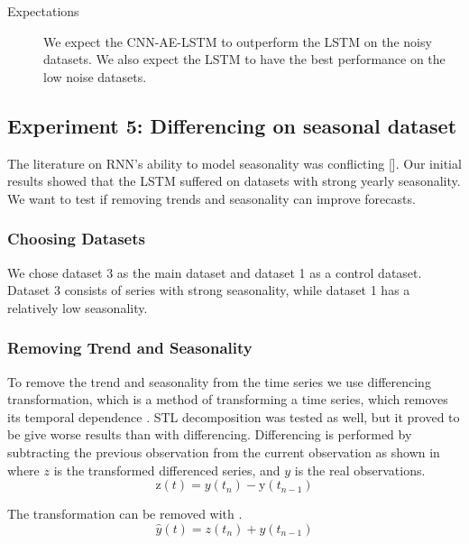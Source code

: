 \begin{description}
  \item[Expectations]{
              We expect the CNN-AE-LSTM to outperform the LSTM on the noisy datasets.
              We also expect the LSTM to have the best performance on the low noise datasets.
        }
\end{description}

\subsection{Experiment 5: Differencing on seasonal dataset}
\label{section:results:additional-experimental-plan:Experiment-5}
The literature on RNN's ability to model seasonality was conflicting [].
Our initial results showed that the LSTM suffered on datasets with strong yearly seasonality.
We want to test if removing trends and seasonality can improve forecasts.

\subsubsection{Choosing Datasets}
We chose dataset 3 as the main dataset and dataset 1 as a control dataset.
Dataset 3 consists of series with strong seasonality, while dataset 1 has a relatively low seasonality.

\subsubsection{Removing Trend and Seasonality}
To remove the trend and seasonality from the time series
we use differencing transformation, which is a method of transforming a time series,
which removes its temporal dependence \cite[p. 215]{RobJHyndman2014}.
STL decomposition was tested as well, but it proved to be give worse results than with differencing.
Differencing is performed by subtracting the previous observation from the current
observation as shown in  where $z$ is the
transformed differenced series, and $y$ is the real observations.
\begin{equation}
  \text{z}(t) = y(t_n) - \text{y}(t_{ n-1 })
  \label{eq:differencing}
\end{equation}

The transformation can be removed with .
\begin{equation}
  \hat{y}(t) = z(t_n) + y(t_{ n-1 })
  \label{eq:differencing-inverted}
\end{equation}

